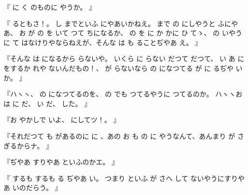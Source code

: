 
『
に
く
のものに
やうか。
』

『
るともさ！。
し
までといふ
にやあいかねえ。
まで
の
にしやうと
ふにやあ、
お
が
の
を
いて
つて
ちになるか、
の
を
に
か
かに
ひ
てゝ、
の
いやうに
て
はなけりやならねえが、そんな
は
も
ることぢやあ
え。
』

『そんな
は
になるから
らないや。
いくら
に
らない
だつて
だつて、
い
あ
に
をするか
れや
ないんだもの！、
が
らないなら
の
になつてる
が
に
るぢや
いか。
』

『ハヽヽ、
の
になつてるのを、
の
でも
つてるやうに
つてるのか。
ハヽヽお
は
に
だ、
い
だ、
した。
』

『お
やかしで
いよ、
にしてツ！。
』

『それだつて
も
があるのに
に
、あの
お
も
の
に
やうなんて、あんまり
が
さ
ぎるからナ。
』

『ぢやあ
すりやあ
といふのかエ。
』

『
するも
するも
る
ぢやあ
い。
つまり
といふ
が
さへ
して
ないやうにすりやあ
いのだらう。
』

